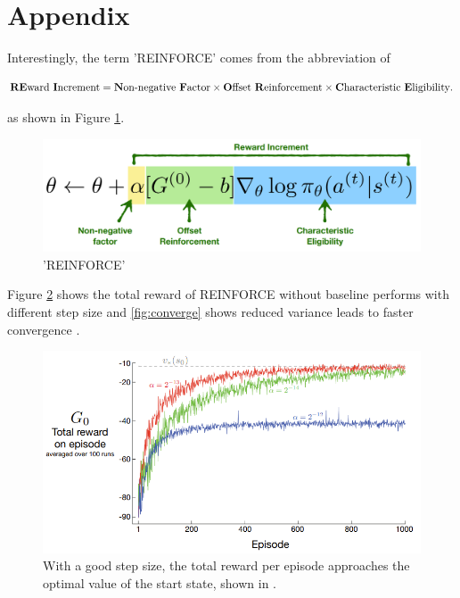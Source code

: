 \documentclass[11pt]{article}
\begin{document}
\nocite{*}
{


}


\section{Appendix}

Interestingly, the term 'REINFORCE' comes from the abbreviation of 

$$\text{\textbf{RE}ward \textbf{I}ncrement} = \text{\textbf{N}on-negative \textbf{F}actor} \times \text{\textbf{O}ffset \textbf{R}einforcement} \times \text{\textbf{C}haracteristic \textbf{E}ligibility}.$$

as shown in Figure \ref{fig:REINFORCEMENT}.

\begin{figure}[H]
    \centering
    \includegraphics[width = 0.5\linewidth]{1.PNG}
    \caption{'REINFORCE'}
    \label{fig:REINFORCEMENT}
\end{figure}

Figure \ref{fig:stepsize} shows the total reward of REINFORCE without baseline performs with different step size and \ref{fig:converge} shows reduced variance leads to faster convergence \cite{sutton2018reinforcement}.
\begin{figure}[H]
    \centering
    \includegraphics[width = 0.7\linewidth]{3.PNG}
    \caption{With a good step
size, the total reward per episode approaches the optimal value of the start state, shown in \cite{sutton2018reinforcement}.}
    \label{fig:stepsize}
\end{figure}
\end{document}
